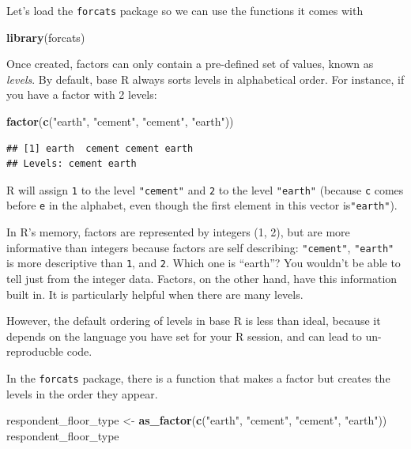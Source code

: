\documentclass[]{book}
\newenvironment{Shaded}{\begin{snugshade}}{\end{snugshade}}
\newcommand{\KeywordTok}[1]{\textcolor[rgb]{0.13,0.29,0.53}{\textbf{#1}}}
\newcommand{\StringTok}[1]{\textcolor[rgb]{0.31,0.60,0.02}{#1}}
\newcommand{\NormalTok}[1]{#1}
\begin{document}
Let's load the \texttt{forcats} package so we can use the functions it
comes with

\begin{Shaded}
\begin{Highlighting}[]
\KeywordTok{library}\NormalTok{(forcats)}
\end{Highlighting}
\end{Shaded}

Once created, factors can only contain a pre-defined set of values,
known as \emph{levels}. By default, base R always sorts levels in
alphabetical order. For instance, if you have a factor with 2 levels:

\begin{Shaded}
\begin{Highlighting}[]
\KeywordTok{factor}\NormalTok{(}\KeywordTok{c}\NormalTok{(}\StringTok{"earth"}\NormalTok{, }\StringTok{"cement"}\NormalTok{, }\StringTok{"cement"}\NormalTok{, }\StringTok{"earth"}\NormalTok{))}
\end{Highlighting}
\end{Shaded}

\begin{verbatim}
## [1] earth  cement cement earth 
## Levels: cement earth
\end{verbatim}

R will assign \texttt{1} to the level \texttt{"cement"} and \texttt{2}
to the level \texttt{"earth"} (because \texttt{c} comes before
\texttt{e} in the alphabet, even though the first element in this vector
is\texttt{"earth"}).

In R's memory, factors are represented by integers (1, 2), but are more
informative than integers because factors are self describing:
\texttt{"cement"}, \texttt{"earth"} is more descriptive than \texttt{1},
and \texttt{2}. Which one is ``earth''? You wouldn't be able to tell
just from the integer data. Factors, on the other hand, have this
information built in. It is particularly helpful when there are many
levels.

However, the default ordering of levels in base R is less than ideal,
because it depends on the language you have set for your R session, and
can lead to un-reproducble code.

In the \texttt{forcats} package, there is a function that makes a factor
but creates the levels in the order they appear.

\begin{Shaded}
\begin{Highlighting}[]
\NormalTok{respondent_floor_type <-}\StringTok{ }\KeywordTok{as_factor}\NormalTok{(}\KeywordTok{c}\NormalTok{(}\StringTok{"earth"}\NormalTok{, }\StringTok{"cement"}\NormalTok{, }\StringTok{"cement"}\NormalTok{, }\StringTok{"earth"}\NormalTok{))}
\NormalTok{respondent_floor_type}
\end{Highlighting}
\end{Shaded}
\end{document}
